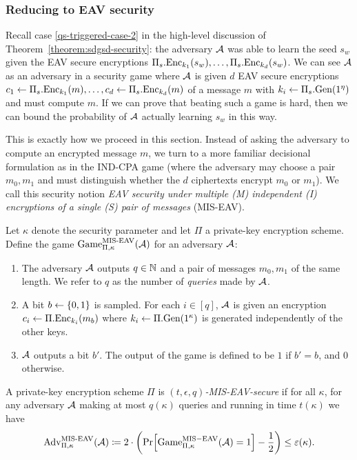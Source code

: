 \subsubsection{Reducing to EAV security}

Recall case \ref{qs-triggered-case-2} in the high-level discussion of Theorem~\ref{theorem:sdgsd-security}: the adversary $\mathcal{A}$ was able to learn the seed $s_w$ given the EAV secure encryptions $\Pi_s.\mathrm{Enc}_{k_1}(s_w), \ldots, \Pi_s.\mathrm{Enc}_{k_d}(s_w)$. We can see $\mathcal{A}$ as an adversary in a security game where $\mathcal{A}$ is given $d$ EAV secure encryptions $c_1 \leftarrow \Pi_s.\mathrm{Enc}_{k_1}(m), \ldots, c_d \leftarrow \Pi_s.\mathrm{Enc}_{k_d}(m)$ of a message $m$ with $k_i \leftarrow \Pi_s.\mathrm{Gen}(1^\eta)$ and must compute $m$. If we can prove that beating such a game is hard, then we can bound the probability of $\mathcal{A}$ actually learning $s_w$ in this way.

This is exactly how we proceed in this section. Instead of asking the adversary to compute an encrypted message $m$, we turn to a more familiar decisional formulation as in the IND-CPA game (where the adversary may choose a pair $m_0, m_1$ and must distinguish whether the $d$ ciphertexts encrypt $m_0$ or $m_1$). We call this security notion \emph{EAV security under multiple (M) independent (I) encryptions of a single (S) pair of messages} (MIS-EAV).

\begin{definition}
	Let $\kappa$ denote the security parameter and let $\Pi$ a private-key encryption scheme. Define the game $\mathrm{Game}_{\Pi, \kappa}^{\mathrm{MIS\text{-}EAV}}(\mathcal{A})$ for an adversary $\mathcal{A}$:
	\begin{enumerate}[1.]
		\item The adversary $\mathcal{A}$ outputs $q \in \mathbb{N}$ and a pair of messages $m_0, m_1$ of the same length. We refer to $q$ as the number of \emph{queries} made by $\mathcal{A}$.
		\item A bit $b \leftarrow \{0, 1\}$ is sampled. For each $i \in [q]$, $\mathcal{A}$ is given an encryption $c_i \leftarrow \Pi.\mathrm{Enc}_{k_i}(m_b)$ where $k_i \leftarrow \Pi.\mathrm{Gen}(1^\kappa)$ is generated independently of the other keys.
		\item $\mathcal{A}$ outputs a bit $b'$. The output of the game is defined to be $1$ if $b' = b$, and $0$ otherwise.
	\end{enumerate}
\end{definition}

\begin{definition}
	A private-key encryption scheme $\Pi$ is \emph{$(t, \epsilon, q)$-MIS-EAV-secure} if for all $\kappa$, for any adversary $\mathcal{A}$ making at most $q(\kappa)$ queries and running in time $t(\kappa)$ we have
	\begin{align*}
		\advantage{\Pi}{\kappa}{MIS\text{-}EAV}(\adv) \coloneqq 2 \cdot \left(\pr{\game{\Pi}{\kappa}{MIS-EAV}(\adv) = 1} - \frac{1}{2}\right) \le \epsilon(\kappa).
	\end{align*}
\end{definition}

